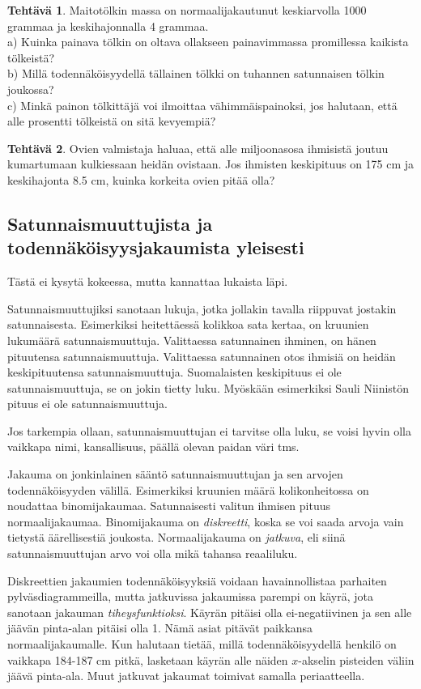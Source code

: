 \documentclass[12pt,leqno,a4paper,oneside]{amsart}
\theoremstyle{definition}
\newtheorem{exercise}{Tehtävä}
\theoremstyle{remark}
\numberwithin{equation}{section}
\begin{document}
\begin{exercise}
  Maitotölkin massa on normaalijakautunut keskiarvolla 1000 grammaa ja keskihajonnalla 4 grammaa.\\
  a) Kuinka painava tölkin on oltava ollakseen painavimmassa promillessa kaikista tölkeistä?\\
  b) Millä todennäköisyydellä tällainen tölkki on tuhannen satunnaisen tölkin joukossa?\\
  c) Minkä painon tölkittäjä voi ilmoittaa vähimmäispainoksi, jos halutaan, että alle prosentti tölkeistä on sitä kevyempiä?
\end{exercise}

\begin{exercise}
  Ovien valmistaja haluaa, että alle miljoonasosa ihmisistä joutuu kumartumaan kulkiessaan heidän ovistaan. Jos ihmisten keskipituus on
  175 cm ja keskihajonta 8.5 cm, kuinka korkeita ovien pitää olla?
\end{exercise}

\subsection{Satunnaismuuttujista ja todennäköisyysjakaumista y\-lei\-ses\-ti} Tästä ei kysytä kokeessa, mutta kannattaa lukaista läpi.

Satunnaismuuttujiksi sanotaan lukuja, jotka jollakin tavalla riip\-pu\-vat jostakin satunnaisesta. Esimerkiksi heitettäessä kolikkoa sata kertaa,
on kruunien lukumäärä satunnaismuuttuja. Valittaessa satunnainen ihminen, on hänen pituutensa satunnaismuuttuja. Valittaessa satunnainen otos
ihmisiä on heidän keskipituutensa satunnaismuuttuja. Suomalaisten keskipituus ei ole satunnaismuuttuja, se on jokin tietty luku. Myöskään
esimerkiksi Sauli Niinistön pituus ei ole satunnais\-muuttuja.

Jos tarkempia ollaan, satunnaismuuttujan ei tarvitse olla luku, se voisi hyvin olla vaikkapa nimi, kansallisuus, päällä olevan paidan väri tms.

Jakauma on jonkinlainen sääntö satunnaismuuttujan ja sen arvojen todennäköisyyden välillä. Esimerkiksi kruunien määrä kolikonheitossa on
noudattaa binomijakaumaa. Satunnaisesti valitun ihmisen pituus normaalijakaumaa. Binomijakauma on \emph{diskreetti}, koska se voi saada 
arvoja vain tietystä äärellisestiä joukosta. Normaalijakauma on \emph{jatkuva}, eli siinä satunnaismuuttujan arvo voi olla mikä tahansa reaaliluku.

Diskreettien jakaumien todennäköisyyksiä voidaan havainnollistaa par\-hai\-ten pylväsdiagrammeilla, mutta jatkuvissa jakaumissa parempi on käyrä,
jota sanotaan jakauman \emph{tiheysfunktioksi}. Käyrän pitäisi olla \mbox{ei-negatiivinen} ja sen alle jäävän pinta-alan pitäisi olla 1. Nämä asiat pitävät 
paikkansa normaalijakaumalle. Kun halutaan tietää, millä todennäköisyydellä henkilö on vaikkapa 184-187 cm pitkä, lasketaan käyrän alle näiden 
$x$-akselin pisteiden
väliin jäävä pinta-ala. Muut jatkuvat jakaumat toimivat samalla periaatteella.
\end{document}
